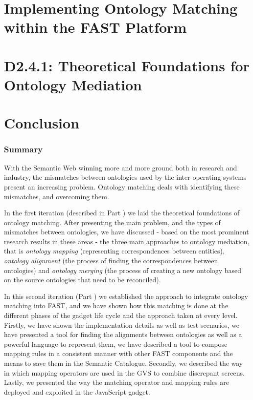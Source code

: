 \documentclass{fast_latex}
\begin{document}
\pagebreak
\part{Implementing Ontology Matching within the FAST Platform}
\label{part:d2.4.2}



\pagebreak
\part{D2.4.1: Theoretical Foundations for Ontology Mediation}
\label{part:d2.4.1}



\pagebreak
\part{Conclusion}

\pagebreak
\section{Summary}
\label{sec:summary}
With the Semantic Web winning more and more ground both in research and industry, the mismatches between ontologies used by the inter-operating systems present an increasing problem. Ontology matching deals with identifying these mismatches, and overcoming them. 

In the first iteration (described in Part \ref{part:d2.4.1}) we laid the theoretical foundations of ontology matching. After presenting the main problem, and the types of mismatches between ontologies, we have discussed - based on the most prominent research results in these areas - the three main approaches to ontology mediation, that is \textit{ontology mapping} (representing  correspondences between entities), \textit{ontology alignment} (the process of finding the correspondences between ontologies) and \textit{ontology merging }(the process of creating a new ontology based
on the source ontologies that need to be reconciled). 

In this second iteration (Part \ref{part:d2.4.2}) we established the approach to integrate ontology matching into FAST, and we have shown how this matching is done at the different phases of the gadget life cycle and the approach taken at every level. Firstly, we have shown the implementation details as well as test scenarios, we have presented a tool for finding the alignments between ontologies as well as a powerful language to represent them, we have described a tool to compose mapping rules in a consistent manner with other FAST components and the means to save them in the Semantic Catalogue. Secondly, we described the way in which mapping operators are used in the GVS to combine discrepant screens. Lastly, we presented the way the matching operator and mapping rules are deployed and exploited in the JavaScript gadget.
\end{document}
